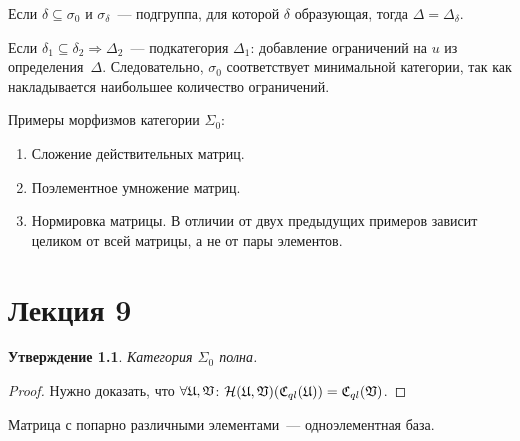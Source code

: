\documentclass[a4paper, 12pt]{report}
\newtheorem{St}{Утверждение}[chapter]
\begin{document}
Если $\delta \subseteq \sigma_0$ и $\sigma_{\delta}$~--- подгруппа, для которой $\delta$ образующая, тогда $\Delta = \Delta_{\delta}$.

Если $\delta_1 \subseteq \delta_2 \Rightarrow \Delta_2$~--- подкатегория $\Delta_1$: добавление ограничений на $u$ из определения~$\Delta$. Следовательно, $\sigma_0$ соответствует минимальной категории, так как накладывается наибольшее количество ограничений.

Примеры морфизмов категории $\Sigma_0$:
\begin{enumerate}
\item Сложение действительных матриц.
\item Поэлементное умножение матриц.
\item Нормировка матрицы. В отличии от двух предыдущих примеров зависит целиком от всей матрицы, а не от пары элементов. 
\end{enumerate} 
\chapter{Лекция 9}
\begin{St}
Категория $\Sigma_0$ полна.
\end{St}
\begin{proof}
Нужно доказать, что $\forall \mathfrak{U}, \mathfrak{V}$: $\mathcal{H}(\mathfrak{U}, \mathfrak{V})(\mathfrak{C}_{ql}(\mathfrak{U})) = \mathfrak{C}_{ql}(\mathfrak{V})$. 
\end{proof}

Матрица с попарно различными элементами~--- одноэлементная база.
\end{document}
